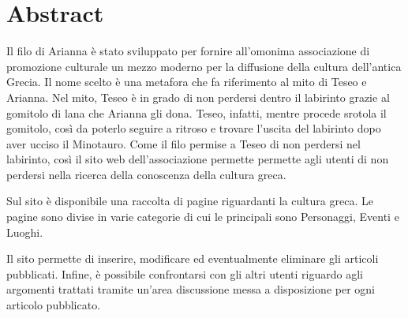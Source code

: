 \section*{Abstract}

Il filo di Arianna è stato sviluppato per fornire all'omonima associazione di promozione culturale un mezzo moderno per la diffusione della cultura dell'antica Grecia.
Il nome scelto è una metafora che fa riferimento al mito di Teseo e Arianna.
Nel mito, Teseo è in grado di non perdersi dentro il labirinto grazie al gomitolo di lana che Arianna gli dona. Teseo, infatti, mentre procede srotola il gomitolo, così da poterlo seguire a ritroso e trovare l'uscita del labirinto dopo aver ucciso il Minotauro.
Come il filo permise a Teseo di non perdersi nel labirinto, così il sito web dell'associazione permette permette agli utenti di non perdersi nella ricerca della conoscenza della cultura greca.

Sul sito è disponibile una raccolta di pagine riguardanti la cultura greca. 
Le pagine sono divise in varie categorie di cui le principali sono Personaggi, Eventi e Luoghi. 

Il sito permette di inserire, modificare ed eventualmente eliminare gli articoli pubblicati. Infine, è possibile confrontarsi con gli altri utenti riguardo agli argomenti trattati tramite un'area discussione messa a disposizione per ogni articolo pubblicato.